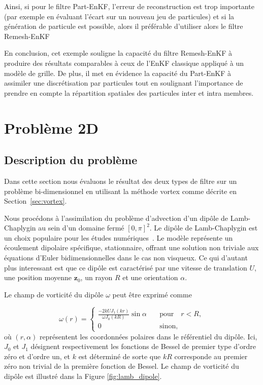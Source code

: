 Ainsi, si pour le filtre Part-EnKF, l'erreur de reconstruction est trop importante (par exemple en évaluant l'écart sur un nouveau jeu de particules) et si la génération de particule est possible, alors il préférable d'utiliser alors le filtre Remesh-EnKF

En conclusion, cet exemple souligne la capacité du filtre Remesh-EnKF à produire des résultats comparables à ceux de l'EnKF classique appliqué à un modèle de grille. De plus, il met en évidence la capacité du Part-EnKF à assimiler une discrétisation par particules tout en soulignant l'importance de prendre en compte la répartition spatiales des particules inter et intra membres.

\section{Problème 2D}

\subsection{Description du problème}

Dans cette section nous évaluons le résultat des deux types de filtre sur un problème bi-dimensionnel en utilisant la méthode vortex comme décrite en Section~\ref{sec:vortex}.

Nous procédons à l'assimilation du problème d'advection d'un dipôle de Lamb-Chaplygin au sein d'un domaine fermé $[0, \pi]^2$. Le dipôle de Lamb-Chaplygin est un choix populaire pour les études numériques~\cite{orlandi_vortex_1990}. Le modèle représente un écoulement dipolaire spécifique, stationnaire, offrant une solution non triviale aux équations d'Euler bidimensionnelles dans le cas non visqueux. Ce qui d'autant plus interessant est que ce dipôle est caractérisé par une vitesse de translation \(U\), une position moyenne \(\bm{z}_0\), un rayon \(R\) et une orientation \(\alpha\).

Le champ de vorticité du dipôle \(\omega\) peut être exprimé comme

\begin{equation*}
    \omega(r) = \begin{cases}
        \frac{-2 k U J_1(kr)}{\omega J_0(kR)} \sin \alpha \quad & \text{pour} \quad r < R, \\
        0 \quad                                                 & \text{sinon},
    \end{cases}
\end{equation*}
où \((r, \alpha)\) représentent les coordonnées polaires dans le référentiel du dipôle. Ici, \(J_0\) et \(J_1\) désignent respectivement les fonctions de Bessel de premier type d'ordre zéro et d'ordre un, et \(k\) est déterminé de sorte que \(kR\) corresponde au premier zéro non trivial de la première fonction de Bessel. Le champ de vorticité du dipôle est illustré dans la Figure \ref{fig:lamb_dipole}.

